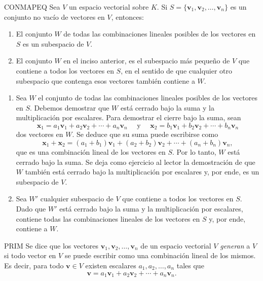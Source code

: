 \begin{theorem}{}{CONMAPEQ}
    Sea $V$ un espacio vectorial sobre $K$. Si $S = \{\mathbf{v}_1, \mathbf{v}_2, \dots, \mathbf{v}_n\}$ es un conjunto no vacío de vectores en $V$, entonces:
    \begin{enumerate}[label=\alph*), topsep=6pt, itemsep=0pt]
        \item El conjunto $W$ de todas las combinaciones lineales posibles de los vectores en $S$ es un subespacio de $V$.
        \item El conjunto $W$ en el inciso anterior, es el subespacio más pequeño de $V$ que contiene a todos los vectores en $S$, en el sentido de que cualquier otro subespacio que contenga esos vectores también contiene a $W$.
    \end{enumerate}
    \newpage
    \demostracion
    \begin{enumerate}[label=\alph*), topsep=6pt, itemsep=0pt]
        \item Sea $W$ el conjunto de todas las combinaciones lineales posibles de los vectores en $S$. Debemos demostrar que $W$ está cerrado bajo la suma y la multiplicación por escalares. Para demostrar el cierre bajo la suma, sean
        $$\mathbf{x}_1 = a_1\mathbf{v}_1 + a_2\mathbf{v}_2 + \cdots + a_n\mathbf{v}_n \quad \text{ y } \quad \mathbf{x}_2 = b_1\mathbf{v}_1 + b_2\mathbf{v}_2 + \cdots + b_n\mathbf{v}_n$$
        dos vectores en $W$. Se deduce que su suma puede escribirse como
        $$\mathbf{x}_1 + \mathbf{x}_2 = (a_1 + b_1) \mathbf{v}_1 + (a_2 + b_2) \mathbf{v}_2 + \cdots + (a_n + b_n) \mathbf{v}_n,$$
        que es una combinación lineal de los vectores en $S$. Por lo tanto, $W$ está cerrado bajo la suma. Se deja como ejercicio al lector la demostración de que $W$ también está cerrado bajo la multiplicación por escalares y, por ende, es un subespacio de $V$.
        \item Sea $W'$ cualquier subespacio de $V$ que contiene a todos los vectores en $S$. Dado que $W'$ está cerrado bajo la suma y la multiplicación por escalares, contiene todas las combinaciones lineales de los vectores en $S$ y, por ende, contiene a $W$.
    \end{enumerate}
\end{theorem}

\begin{definicion}{}{PRIM}
    Se dice que los vectores $\mathbf{v}_1, \mathbf{v}_2, \dots, \mathbf{v}_n$ de un espacio vectorial $V$ \emph{generan} a $V$ si todo vector en $V$ se puede escribir como una combinación lineal de los mismos. Es decir, para todo $\mathbf{v} \in V$ existen escalares $a_1, a_2, \dots, a_n$ tales que
    $$\mathbf{v} = a_1\mathbf{v}_1 + a_2\mathbf{v}_2 + \cdots + a_n\mathbf{v}_n.$$
\end{definicion}

